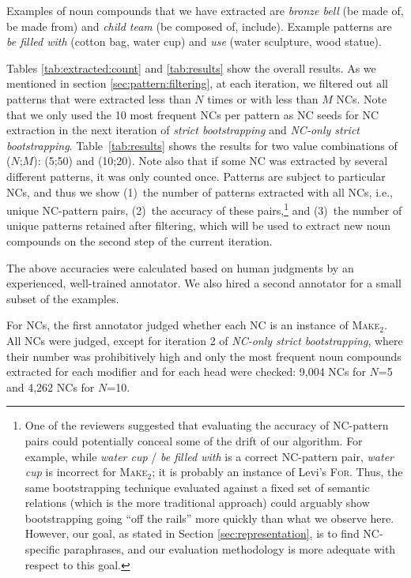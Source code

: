 \documentclass[letterpaper,11pt]{article}
\newcommand{\tabref}[2][]{Table#1~\ref{#2}\xspace}
\begin{document}
Examples of noun compounds that we have extracted are \textit{bronze bell}  (be made of,  be made from)
and \textit{child team}  (be  composed  of,  include).
Example patterns  are \textit{be filled with} (cotton bag, water cup)
and \textit{use}  (water sculpture, wood  statue).


Tables    \ref{tab:extracted:count} and \ref{tab:results} show
the    overall     results.    As    we    mentioned     in    section
\ref{sec:pattern:filtering}, at  each iteration,  we filtered  out all
patterns that were extracted less than $N$ times or with less than $M$
NCs.
Note that
we only used the 10 most frequent NCs per pattern as NC seeds
for NC extraction in the next iteration
of \emph{strict bootstrapping} and \emph{NC-only strict bootstrapping}.
\tabref{tab:results} shows the results for two value combinations of ($N$;$M$): (5;50) and (10;20).
Note also that if some NC was extracted by  several different patterns, it was only counted once.
Patterns are subject to particular NCs,
and thus we show
(1)~the number of patterns extracted with all NCs, i.e., unique NC-pattern pairs,
(2)~the accuracy of these pairs,\footnote{One of the reviewers suggested that
evaluating the accuracy of NC-pattern pairs could potentially conceal some of the drift of our algorithm.
For example, while \emph{water cup} / \emph{be filled with} is a correct NC-pattern pair,
\emph{water cup} is incorrect for \textsc{Make$_2$};
it is probably an instance of Levi's \textsc{For}.
Thus, the same bootstrapping technique evaluated against a fixed set of semantic relations
(which is the more traditional approach)
could arguably show bootstrapping going ``off the rails'' more quickly
than what we observe here.
However, our goal, as stated in Section \ref{sec:representation},
is to find NC-specific paraphrases,
and our evaluation methodology is more adequate with respect to this goal.}
and
(3)~the number of unique patterns retained after filtering,
which will be used to extract new noun compounds on the second step of the current iteration.



The above accuracies were calculated based on  human judgments
by an experienced, well-trained annotator.
We also hired a second annotator for a small subset of the examples.

For NCs,  the first annotator  judged whether  each NC is  an instance
of  \textsc{Make$_2$}.  All  NCs  were judged,  except  for  iteration
2 of \emph{NC-only  strict bootstrapping},  where their  number was
prohibitively high and only the most frequent noun compounds extracted
for each modifier and for each  head were checked: 9,004 NCs for $N$=5
and 4,262 NCs for $N$=10.
\end{document}
